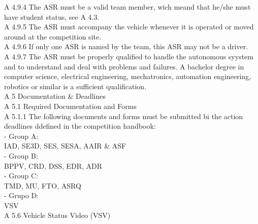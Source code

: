 \documentclass{article}
\begin{document}
A 4.9.4 The ASR must be a valid team member, wich meand that he/she must have student status, see A 4.3.\\

A 4.9.5 The ASR must accompany the vehicle whenever it is operated or moved around at the competition site.\\

A 4.9.6 If only one ASR is named by the team, this ASR may not be a driver.\\

A 4.9.7 The ASR must be properly qualified to handle the autonomous syystem and to understand and deal with problems and failures. A bachelor degree in computer science, electrical engineering, mechatronics, automation engineering, robotics or similar is a sufficient qualification.\\

A 5 Documentation & Deadlines\\

A 5.1 Required Documentation and Forms\\

A 5.1.1 The following documents and forms must be submitted bi the action deadlines ddefined in the competition handbook:\\
	- Group A:\\
		IAD, SE3D, SES, SESA, AAIR & ASF\\
	- Group B:\\
		BPPV, CRD, DSS, EDR, ADR\\
	- Group C:\\
		TMD, MU, FTO, ASRQ\\
	- Grupo D:\\
		VSV\\

A 5.6 Vehicle Status Video (VSV)\\
\end{document}
